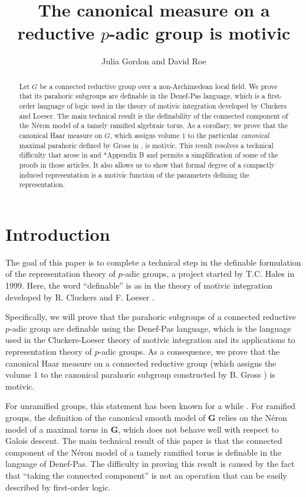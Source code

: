 \documentclass{amsart}
\title[]{The canonical measure on a reductive $p$-adic group is motivic}
\author{Julia Gordon and David Roe}
\newcommand{\bG}{\mathbf{G}}
\theoremstyle{plain}
\theoremstyle{definition}
\begin{document}
\begin{abstract}  Let $G$ be a connected reductive group over a non-Archimedean local field. 
We prove that its parahoric subgroups are definable in the Denef-Pas language, which is a
first-order language of logic used in the theory of motivic integration developed by Cluckers and Loeser.
The main technical result is the definability of the connected component of the N\'eron model
of a tamely ramified algebraic torus.  As a corollary, we prove that the canonical Haar measure on $G$,
which assigns volume $1$ to the particular \emph{canonical} maximal parahoric defined by
Gross in \cite{gross:97a}, is motivic. This result resolves a technical difficulty that arose in
\cite{cluckers-gordon-halupczok:14b} and \cite{shin-templier:15a}*{Appendix B} and permits a simplification of some of the proofs in those articles. 
It also allows us to show that formal degree of a compactly induced representation is a
motivic function of the parameters defining the representation. 
\end{abstract}
\maketitle

\section{Introduction}
The goal of this paper is to complete a technical step in the 
definable formulation of 
the representation theory of $p$-adic groups, a project started by T.C. Hales in 1999. 
Here, the word ``definable'' is as in the theory of motivic integration developed by R. Cluckers and F. Loeser \cite{cluckers-loeser:08a}.

Specifically, we will prove that the parahoric subgroups of a connected reductive $p$-adic group
are definable using the Denef-Pas language, which is the language used in the Cluckers-Loeser
theory of motivic integration and its applications to representation theory of $p$-adic groups.
As a consequence, we prove that the canonical Haar measure on a connected reductive group 
(which assigns the volume $1$ to the canonical parahoric subgroup constructed by B. Gross \cite{gross:97a}) is motivic.

For unramified groups, this statement has been known for a while \cite{cluckers-hales-loeser}.
For ramified groups, the definition of the canonical smooth model of $\bG$ relies on the
N\'eron model of a maximal torus in $\bG$, which does not behave well with respect to Galois descent.
The main technical result of this paper is that the connected component of the N\'eron model
of a tamely ramified torus is definable in the language of Denef-Pas. The difficulty in proving this result
is caused by the fact that ``taking the connected component'' is not an operation that can be easily
described by first-order logic. 
\end{document}
